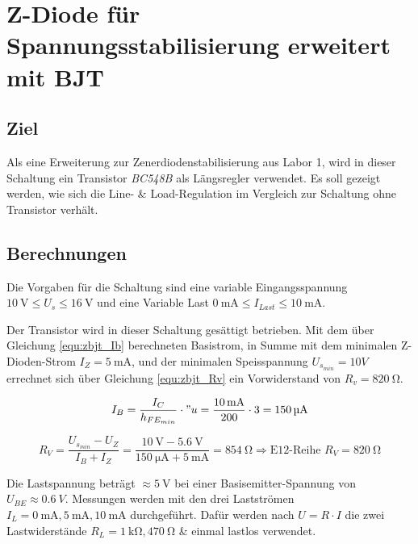 \documentclass[../main.tex]{subfiles}
\begin{document}
\section{Z-Diode für Spannungsstabilisierung erweitert mit BJT}

\subsection{Ziel}

Als eine Erweiterung zur Zenerdiodenstabilisierung aus Labor 1, wird in dieser Schaltung ein Transistor \textit{BC548B} als Längsregler verwendet. Es soll gezeigt werden, wie sich die Line- \& Load-Regulation im Vergleich zur Schaltung ohne Transistor verhält.

\subsection{Berechnungen}
Die Vorgaben für die Schaltung sind eine variable Eingangsspannung $\SI{10}{\volt} \le U_s \le \SI{16}{\volt}$ und eine Variable Last $\SI{0}{\milli\ampere} \le I_{Last} \le \SI{10}{\milli\ampere}$.

Der Transistor wird in dieser Schaltung gesättigt betrieben. Mit dem über Gleichung \ref{equ:zbjt_Ib} berechneten Basistrom, in Summe mit dem minimalen Z-Dioden-Strom $I_Z = \SI{5}{\milli\ampere}$, und der minimalen Speisspannung $U_{s_{min}} = 10V$ errechnet sich über Gleichung \ref{equ:zbjt_Rv} ein Vorwiderstand von $R_v = \SI{820}{\ohm}$.

\begin{equation}
    I_{B} = \frac{I_C}{h_{FE_{min}}} \cdot {"u} = \frac{\SI{10}{\milli\ampere}}{200} \cdot 3=\SI{150}{\micro\ampere}
    \label{equ:zbjt_Ib}
\end{equation}

\begin{equation}
    R_{V} = \frac{U_{s_{min}} - U_Z}{I_B + I_Z} = \frac{\SI{10}{\volt} - \SI{5.6}{\volt}}{\SI{150}{\micro\ampere} + \SI{5}{\milli\ampere}} = \SI{854}{\ohm} \Rightarrow \textrm{E12-Reihe } R_{V} = \SI{820}{\ohm}
    \label{equ:zbjt_Rv}
\end{equation}

Die Lastspannung beträgt $\approx\SI{5}{\volt}$ bei einer Basisemitter-Spannung von $U_{BE} \approx \SI{0.6}{V}$. Messungen werden mit den drei Lastströmen $I_L = \SI{0}{\milli\ampere}, \SI{5}{\milli\ampere}, \SI{10}{\milli\ampere}$ durchgeführt. Dafür werden nach $U=R \cdot I$ die zwei Lastwiderstände $R_L = \SI{1}{\kilo\ohm}, \SI{470}{\ohm}$ \& einmal lastlos verwendet.
\end{document}
